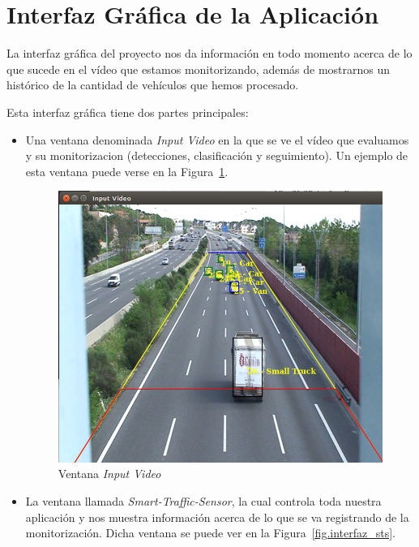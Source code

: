 \section{Interfaz Gráfica de la Aplicación}

La interfaz gráfica del proyecto nos da información en todo momento acerca de lo que sucede en el vídeo que estamos monitorizando, además de mostrarnos un histórico de la cantidad de vehículos que hemos procesado.

Esta interfaz gráfica tiene dos partes principales:
\begin{itemize}
    \item Una ventana denominada \textit{Input Video} en la que se ve el vídeo que evaluamos y su monitorizacion (detecciones, clasificación y seguimiento). Un ejemplo de esta ventana puede verse en la Figura~\ref{fig.input_video}.
     \begin{figure}[H] 
    \begin{center}
    	\includegraphics[scale=0.4]{figures/Diseno_global/sts_buena.png}
       \caption{Ventana \textit{Input Video}}
    	\label{fig.input_video}
    \end{center}
    \end{figure}
    \item La ventana llamada \textit{Smart-Traffic-Sensor}, la cual controla toda nuestra aplicación y nos muestra información acerca de lo que se va registrando de la monitorización. Dicha ventana se puede ver en la Figura~\ref{fig.interfaz_sts}.
     \begin{figure}[H] 

\end{figure}
\end{itemize}
